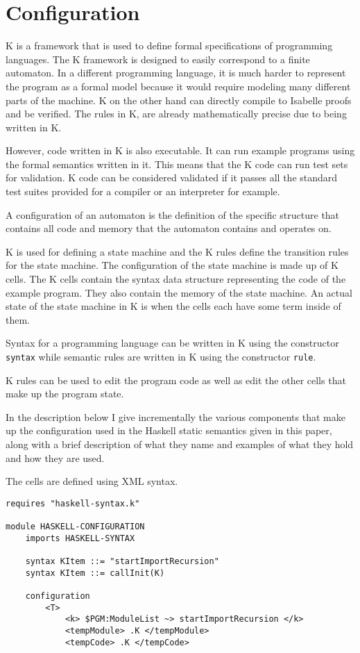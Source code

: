 \chapter{Configuration}
K is a framework that is used to define formal specifications of programming languages. The K framework is designed to easily correspond to a finite automaton. In a different programming language, it is much harder to represent the program as a formal model because it would require modeling many different parts of the machine. K on the other hand can directly compile to Isabelle proofs and be verified. The rules in K, are already mathematically precise due to being written in K.

However, code written in K is also executable. It can run example programs using the formal semantics written in it. This means that the K code can run test sets for validation. K code can be considered validated if it passes all the standard test suites provided for a compiler or an interpreter for example.

A configuration of an automaton is the definition of the specific structure that contains all code and memory that the automaton contains and operates on.

K is used for defining a state machine and the K rules define the transition rules for the state machine. The configuration of the state machine is made up of K cells. The K cells contain the syntax data structure representing the code of the example program. They also contain the memory of the state machine. An actual state of the state machine in K is when the cells each have some term inside of them.

Syntax for a programming language can be written in K using the constructor \texttt{syntax} while semantic rules are written in K using the constructor \texttt{rule}.

K rules can be used to edit the program code as well as edit the other cells that make up the program state.

In the description below I give incrementally the various components that make up the configuration used in the Haskell static semantics given in this paper, along with a brief description of what they name and examples of what they hold and how they are used.

The cells are defined using XML syntax.

\begin{lstlisting}
requires "haskell-syntax.k"

module HASKELL-CONFIGURATION
    imports HASKELL-SYNTAX

    syntax KItem ::= "startImportRecursion"
    syntax KItem ::= callInit(K)

    configuration 
        <T>
            <k> $PGM:ModuleList ~> startImportRecursion </k>
            <tempModule> .K </tempModule>
            <tempCode> .K </tempCode>
\end{lstlisting}


